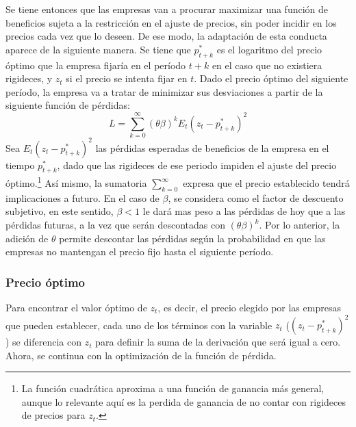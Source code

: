 Se tiene entonces que las empresas van a procurar maximizar una función de beneficios sujeta a la restricción en el ajuste de precios, sin poder incidir en los precios cada vez que lo deseen. De ese modo, la adaptación de esta conducta aparece de la siguiente manera. Se tiene que $p_{t+k}^*$ es el logaritmo del precio óptimo que la empresa fijaría en el período $t+k$ en el caso que no existiera rigideces, y $z_{t}$ si el precio se intenta fijar en $t$.  Dado el precio óptimo del siguiente período, la empresa va a tratar de minimizar sus desviaciones a partir de la siguiente función de pérdidas:
 \begin{equation}\label{1}
L=\sum_{k=0}^{\infty} (\theta\beta)^{k}E_{t}(z_{t}-p_{t+k}^*)^{2}
\end{equation}
Sea $E_{t}(z_{t}-p_{t+k}^*)^{2} $ las pérdidas esperadas de beneficios de la empresa en el tiempo $p_{t+k}^*$, dado que las rigideces de ese periodo impiden el ajuste del precio óptimo.\footnote{La función cuadrática aproxima a una función de ganancia más general, aunque lo relevante aquí es la perdida de ganancia  de no contar con rigideces de precios para $z_{t}$.}  Así mismo, la sumatoria  $\sum_{k=0}^{\infty}$ expresa que el precio establecido tendrá implicaciones a futuro. En el caso de $\beta$, se considera como el factor de descuento subjetivo,  en este sentido, $\beta<1$ le dará mas peso a las pérdidas de hoy que a las  pérdidas futuras, a la vez que serán descontadas con $(\theta\beta)^{k}$. Por lo anterior, la adición de $\theta$ permite descontar las pérdidas según la probabilidad en que las empresas no mantengan el precio fijo hasta el siguiente período.

\subsubsection*{Precio óptimo}\label{secpre}
Para encontrar el valor óptimo de $z_{t}$, es decir, el precio elegido por las empresas que pueden establecer, cada uno de los términos con la variable $z_{t}$ ($(z_{t}-p_{t+k}^*)^{2} $) se diferencia con $z_{t}$ para definir la suma de la derivación que será igual a cero. Ahora, se continua con la optimización de la función de pérdida.\\
 
